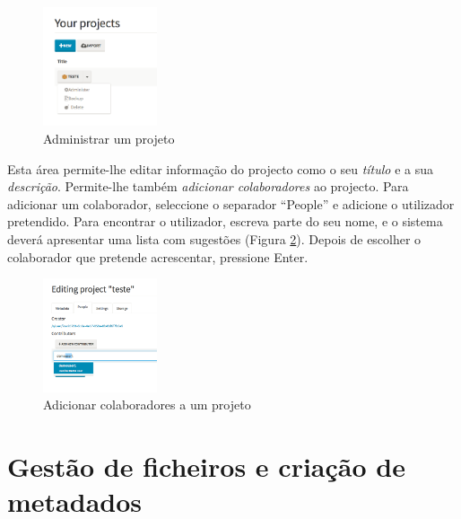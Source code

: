 \documentclass[paper=a4, fontsize=11pt]{scrartcl} %
\numberwithin{equation}{section} %
\numberwithin{figure}{section} %
\numberwithin{table}{section} %
\begin{document}
\begin{figure}[h!t!]
	\centering
	\includegraphics[width=0.3\textwidth]{Images/administer_project}	
	\caption{Administrar um projeto}
	\label{fig:administer_a_project}
\end{figure}

Esta área permite-lhe editar informação do projecto como o seu \emph{título} e a sua \emph{descrição}. Permite-lhe também \emph{adicionar colaboradores} ao projecto. Para adicionar um colaborador, seleccione o separador ``People'' e adicione o utilizador pretendido. Para encontrar o utilizador, escreva parte do seu nome, e o sistema deverá apresentar uma lista com sugestões (Figura \ref{fig:add_collaborators_to_a_project}). Depois de escolher o colaborador que pretende acrescentar, pressione Enter.

\begin{figure}[h!t!]
	\centering	
	\includegraphics[width=0.3\textwidth]{Images/add_collaborators}	
	\caption{Adicionar colaboradores a um projeto}
	\label{fig:add_collaborators_to_a_project}
\end{figure}



\section{Gestão de ficheiros e criação de metadados} %
\label{sec:managing_files_and_creating_metadata_records}
\end{document}
